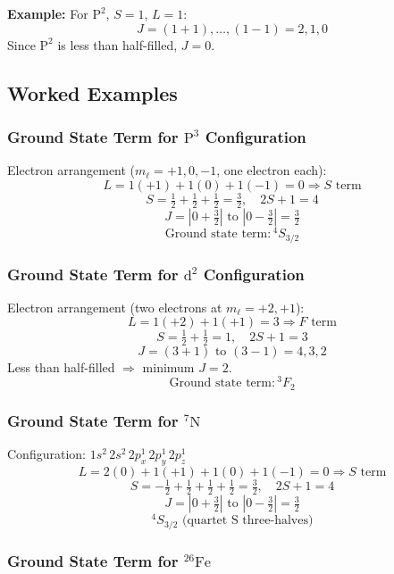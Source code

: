 \documentclass[12pt,a4paper]{article}
\begin{document}
\textbf{Example:} For $\mathrm{P}^2$, $S=1$, $L=1$:
\[
J = (1+1), \ldots, (1-1) = 2, 1, 0
\]
Since $\mathrm{P}^2$ is less than half-filled, $J=0$.

\subsection{Worked Examples}

\subsubsection{Ground State Term for $\mathrm{P}^3$ Configuration}

Electron arrangement ($m_\ell = +1, 0, -1$, one electron each):
\[
L = 1(+1) + 1(0) + 1(-1) = 0 \Rightarrow S\text{ term}
\]
\[
S = \tfrac{1}{2}+\tfrac{1}{2}+\tfrac{1}{2} = \tfrac{3}{2}, \quad 2S+1 = 4
\]
\[
J = \left|0+\tfrac{3}{2}\right| \text{ to } \left|0-\tfrac{3}{2}\right| = \tfrac{3}{2}
\]
\[
\boxed{\text{Ground state term}: {}^4S_{3/2}}
\]

\subsubsection{Ground State Term for $\mathrm{d}^2$ Configuration}

Electron arrangement (two electrons at $m_\ell = +2, +1$):
\[
L = 1(+2)+1(+1) = 3 \Rightarrow F\text{ term}
\]
\[
S = \tfrac{1}{2}+\tfrac{1}{2} = 1, \quad 2S+1 = 3
\]
\[
J = (3+1) \text{ to } (3-1) = 4, 3, 2
\]
Less than half-filled $\Rightarrow$ minimum $J = 2$.
\[
\boxed{\text{Ground state term}: {}^3F_2}
\]

\subsubsection{Ground State Term for $^7\mathrm{N}$}

Configuration: $1s^2\,2s^2\,2p_x^1\,2p_y^1\,2p_z^1$
\[
L = 2(0)+1(+1)+1(0)+1(-1) = 0 \Rightarrow S\text{ term}
\]
\[
S = -\tfrac{1}{2}+\tfrac{1}{2}+\tfrac{1}{2}+\tfrac{1}{2} = \tfrac{3}{2}, \quad 2S+1 = 4
\]
\[
J = \left|0+\tfrac{3}{2}\right| \text{ to } \left|0-\tfrac{3}{2}\right| = \tfrac{3}{2}
\]
\[
\boxed{{}^4S_{3/2} \text{ (quartet S three-halves)}}
\]

\subsubsection{Ground State Term for $^{26}\mathrm{Fe}$}
\end{document}
